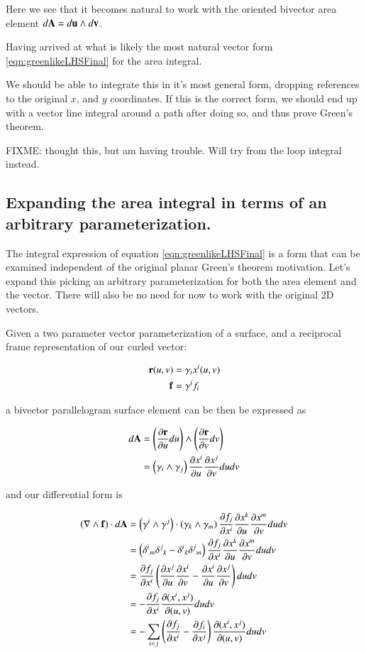 \documentclass{article}
\newcommand{\grad}[0]{\nabla}
\newcommand{\PD}[2]{\frac{\partial {#2}}{\partial {#1}}}
\begin{document}
Here we see that it becomes natural to work with the oriented bivector area element $d\mathbf{A} = d\mathbf{u} \wedge d\mathbf{v}$.

Having arrived at what is likely the most natural vector form \ref{eqn:greenlikeLHSFinal} for the area
integral.

We should be able to 
integrate this in it's most general form, dropping references to the original $x$, and $y$ coordinates.
If this is the correct form, we should end up with a vector line integral around a path after doing so, and thus prove
Green's theorem.

FIXME: thought this, but am having trouble.  Will try from the loop integral instead.

\subsection{ Expanding the area integral in terms of an arbitrary parameterization. }

The integral expression of equation \ref{eqn:greenlikeLHSFinal} is a form that can be examined independent of the original planar Green's theorem motivation.  Let's expand
this picking an arbitrary parameterization for both the area element and the vector.  There will also be no need for now to work with the original 2D vectors.

Given a two parameter vector parameterization of a surface, and a reciprocal frame representation of our curled vector:

\begin{align*}
\mathbf{r}(u,v) &= \gamma_i {x^i}(u,v) \\
\mathbf{f} &= \gamma^i {f_i}
\end{align*}

a bivector parallelogram surface element can be then be expressed as

\begin{align*}
d\BA 
&= \left(\PD{u}{\Br} du\right) \wedge \left(\PD{v}{\Br} dv\right) \\
&= \left(\gamma_i \wedge \gamma_j \right) \PD{u}{x^i} \PD{v}{x^j} du dv \\
\end{align*}

and our differential form is

\begin{align*}
\left(\grad \wedge \Bf\right) \cdot d\BA
&= \left( \gamma^i \wedge \gamma^j \right) \cdot \left(\gamma_k \wedge \gamma_m \right) \PD{x^{i}}{f_j} \PD{u}{x^k} \PD{v}{x^m} du dv \\
&= \left( {\delta^i}_m {\delta^j}_k -{\delta^i}_k {\delta^j}_m \right) \PD{x^{i}}{f_j} \PD{u}{x^k} \PD{v}{x^m} du dv \\
&= \PD{x^{i}}{f_j} \left( \PD{u}{x^j} \PD{v}{x^i} -\PD{u}{x^i} \PD{v}{x^j} \right) du dv \\
&= -\PD{x^{i}}{f_j} \PD{(u,v)}{(x^i, x^j)} du dv \\
&= -\sum_{i<j} \left( \PD{x^{i}}{f_j} -\PD{x^{j}}{f_i} \right) \PD{(u,v)}{(x^i, x^j)} du dv \\
\end{align*}
\end{document}
